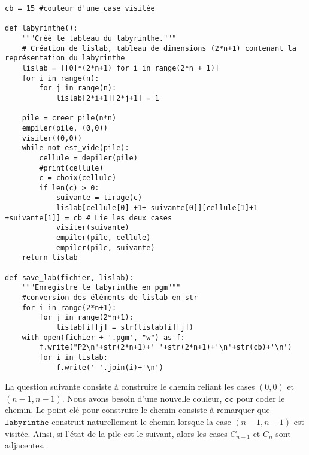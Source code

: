 \documentclass[11pt,a4paper]{article}
\begin{document}
\begin{lstlisting}
cb = 15 #couleur d'une case visitée

def labyrinthe():
	"""Créé le tableau du labyrinthe."""
    # Création de lislab, tableau de dimensions (2*n+1) contenant la représentation du labyrinthe
    lislab = [[0]*(2*n+1) for i in range(2*n + 1)]
    for i in range(n):
        for j in range(n):
            lislab[2*i+1][2*j+1] = 1
    
    pile = creer_pile(n*n)
    empiler(pile, (0,0))
    visiter((0,0))
    while not est_vide(pile):
        cellule = depiler(pile)
        #print(cellule)
        c = choix(cellule)
        if len(c) > 0:
            suivante = tirage(c)
            lislab[cellule[0] +1+ suivante[0]][cellule[1]+1 +suivante[1]] = cb # Lie les deux cases
            visiter(suivante)
            empiler(pile, cellule)
            empiler(pile, suivante)
    return lislab

def save_lab(fichier, lislab):
    """Enregistre le labyrinthe en pgm"""
    #conversion des éléments de lislab en str
    for i in range(2*n+1):
        for j in range(2*n+1):
            lislab[i][j] = str(lislab[i][j])
    with open(fichier + '.pgm', "w") as f:
        f.write("P2\n"+str(2*n+1)+' '+str(2*n+1)+'\n'+str(cb)+'\n')
        for i in lislab:
            f.write(' '.join(i)+'\n')
\end{lstlisting}
\par
La question suivante consiste à construire le chemin reliant les cases $(0,0)$ et $(n-1,n-1)$. Nous avons besoin d'une nouvelle couleur, $\mathtt{cc}$ pour coder le chemin. Le point clé pour construire le chemin consiste à remarquer que $\mathtt{labyrinthe}$ construit naturellement le chemin lorsque la case $(n-1,n-1)$ est visitée. Ainsi, si l'état de la pile est le suivant, alors les cases $C_{n-1}$ et $C_{n}$ sont adjacentes.
\par
\end{document}
